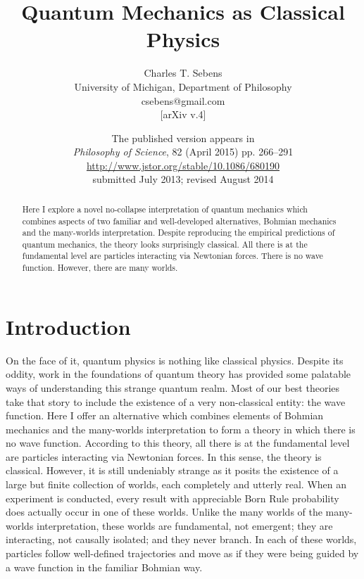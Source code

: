 \documentclass[12pt,secnumarabic,balancelastpage,amsmath,amssymb,nofootinbib]{article}
\begin{document}



\title{Quantum Mechanics as Classical Physics}
\author{Charles T. Sebens\\University of Michigan, Department of Philosophy\\csebens@gmail.com\\ \small{[arXiv v.4]}}
\date{The published version appears in\\\textit{Philosophy of Science}, 82 (April 2015) pp. 266--291\\\small{\url{http://www.jstor.org/stable/10.1086/680190}}\\\small{submitted July 2013; revised August 2014}}

\maketitle

\begin{abstract}
Here I explore a novel no-collapse interpretation of quantum mechanics which combines aspects of two familiar and well-developed alternatives, Bohmian mechanics and the many-worlds interpretation.  Despite reproducing the empirical predictions of quantum mechanics, the theory looks surprisingly classical.  All there is at the fundamental level are particles interacting via Newtonian forces.  There is no wave function.  However, there are many worlds.
\end{abstract}


\newpage

\section{Introduction}
On the face of it, quantum physics is nothing like classical physics.  Despite its oddity, work in the foundations of quantum theory has provided some palatable ways of understanding this strange quantum realm.  Most of our best theories take that story to include the existence of a very non-classical entity: the wave function.  Here I offer an alternative which combines elements of Bohmian mechanics and the many-worlds interpretation to form a theory in which there is no wave function.  According to this theory, all there is at the fundamental level are particles interacting via Newtonian forces.  In this sense, the theory is classical.  However, it is still undeniably strange as it posits the existence of a large but finite collection of worlds, each completely and utterly real.  When an experiment is conducted, every result with appreciable Born Rule probability does actually occur in one of these worlds.  Unlike the many worlds of the many-worlds interpretation, these worlds are fundamental, not emergent; they are interacting, not causally isolated; and they never branch.  In each of these worlds, particles follow well-defined trajectories and move as if they were being guided by a wave function in the familiar Bohmian way.
\end{document}
